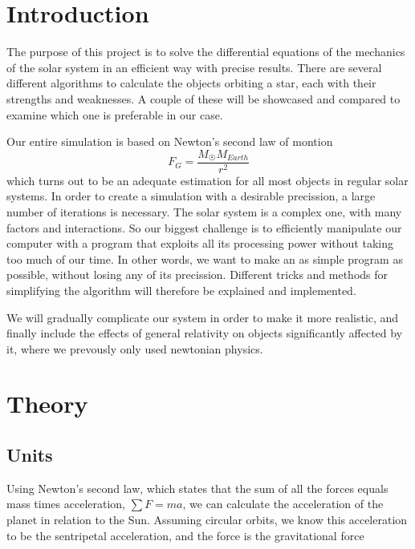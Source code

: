 \documentclass[10pt]{article}
\begin{document}
\newpage



\begin{multicols}{2}
\tableofcontents

{}

\section{Introduction}
The purpose of this project is to solve the differential equations of the
mechanics of the solar system in an efficient way with precise results. There are several different algorithms to calculate the objects orbiting a star, each with their strengths and weaknesses. A couple of these will be showcased and compared to examine which one is preferable in our case.

Our entire simulation is based on Newton's second law of montion
\begin{equation}
    F_G = \frac{M_\Sun M_{Earth}}{r^2}
\end{equation}
which turns out to be an adequate estimation for all most objects in regular solar systems. In order to create a simulation with a desirable precission, a large number of iterations is necessary. The solar system is a complex one, with many factors and interactions. So our biggest challenge is to efficiently manipulate our computer with a program that exploits all its processing power without taking too much of our time. In other words, we want to make an as simple program as possible, without losing any of its precission. Different tricks and methods for simplifying the algorithm will therefore be explained and implemented. 

We will gradually complicate our system in order to make it more realistic, and finally include the effects of general relativity on objects significantly affected by it, where we prevously only used newtonian physics.

\section{Theory}
\subsection{Units}
Using Newton's second law, which states that the sum of all the forces
equals mass times acceleration, $\sum F=ma$, we can calculate the
acceleration of the planet in relation to the Sun. Assuming circular
orbits, we know this acceleration to be the sentripetal acceleration, and
the force is the gravitational force


\end{multicols}
\end{document}
